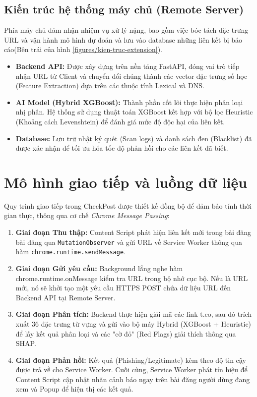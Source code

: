 \subsection{Kiến trúc hệ thống máy chủ (Remote Server)}
Phía máy chủ đảm nhận nhiệm vụ xử lý nặng, bao gồm việc bóc tách đặc trưng URL và vận hành mô hình dự đoán và lưu vào database những liên kết bị báo cáo(Bên trái của hình \ref{figures/kien-truc-extension}).

\begin{itemize}
    \item \textbf{Backend API:} Được xây dựng trên nền tảng FastAPI, đóng vai trò tiếp nhận URL từ Client và chuyển đổi chúng thành các vector đặc trưng số học (Feature Extraction) dựa trên các thuộc tính Lexical và DNS.
    \item \textbf{AI Model (Hybrid XGBoost):} Thành phần cốt lõi thực hiện phân loại nhị phân. Hệ thống sử dụng thuật toán XGBoost kết hợp với bộ lọc Heuristic (Khoảng cách Levenshtein) để đánh giá mức độ độc hại của liên kết.
    \item \textbf{Database:} Lưu trữ nhật ký quét (Scan logs) và danh sách đen (Blacklist) đã được xác nhận để tối ưu hóa tốc độ phản hồi cho các liên kết đã biết.
\end{itemize}

\section{Mô hình giao tiếp và luồng dữ liệu}
\label{sec:giao-tiep-he-thong}

Quy trình giao tiếp trong CheckPost được thiết kế đồng bộ để đảm bảo tính thời gian thực, thông qua cơ chế \textit{Chrome Message Passing}:

\begin{enumerate}
    \item \textbf{Giai đoạn Thu thập:} Content Script phát hiện liên kết mới trong bài đăng bài đăng qua \texttt{MutationObserver} và gửi URL về Service Worker thông qua hàm \texttt{chrome.runtime.sendMessage}.
    \item \textbf{Giai đoạn Gửi yêu cầu:} Background lắng nghe hàm chrome.runtime.onMessage kiểm tra URL trong bộ nhớ cục bộ. Nếu là URL mới, nó sẽ khởi tạo một yêu cầu HTTPS POST chứa dữ liệu URL đến Backend API tại Remote Server.
    \item \textbf{Giai đoạn Phân tích:} Backend thực hiện giải mã các link t.co, sau đó trích xuất 36 đặc trưng từ vựng và gửi vào bộ máy Hybrid (XGBoost + Heuristic) để lấy kết quả phân loại và các "cờ đỏ" (Red Flags) giải thích thông qua SHAP.
    \item \textbf{Giai đoạn Phản hồi:} Kết quả (Phishing/Legitimate) kèm theo độ tin cậy được trả về cho Service Worker. Cuối cùng, Service Worker phát tín hiệu để Content Script cập nhật nhãn cảnh báo ngay trên bài đăng người dùng đang xem và Popup để hiện thị các kết quả.
\end{enumerate}

